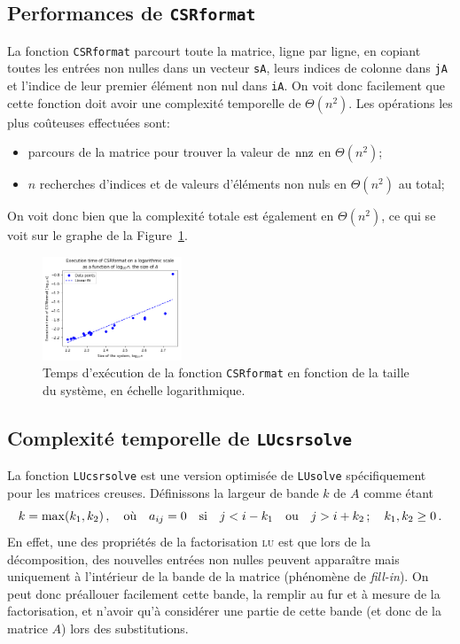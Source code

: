 \documentclass[11pt]{article}
\begin{document}
\subsection{Performances de \texttt{CSRformat}}
\label{sec:csrformat}
La fonction \lstinline|CSRformat| parcourt toute la matrice, ligne par ligne, en copiant toutes les entrées non nulles dans un vecteur \lstinline|sA|, leurs indices de colonne dans \lstinline|jA| et l'indice de leur premier élément non nul dans \lstinline|iA|.
On voit donc facilement que cette fonction doit avoir une complexité temporelle de $\Theta(n^2)$. Les opérations les plus coûteuses effectuées sont:
\begin{itemize}
	\item parcours de la matrice pour trouver la valeur de $\textnormal{nnz}$ en $\Theta(n^2)$;
	\item $n$ recherches d'indices et de valeurs d'éléments non nuls en $\Theta(n^2)$ au total;
\end{itemize}
On voit donc bien que la complexité totale est également en $\Theta(n^2)$, ce qui se voit sur le graphe de la Figure~\ref{fig:csrformat}.
\begin{figure}[H]
	\centering
	\includegraphics[width=0.37\textwidth]{csrformat.png}
	\caption{Temps d'exécution de la fonction \lstinline|CSRformat| en fonction de la taille du système, en échelle logarithmique.}
	\label{fig:csrformat}
\end{figure}
\subsection{Complexité temporelle de \texttt{LUcsrsolve}}
\label{sec:LUcsrsolve}
La fonction \lstinline|LUcsrsolve| est une version optimisée de \lstinline|LUsolve| spécifiquement pour les matrices creuses.
Définissons la largeur de bande $k$ de $A$ comme étant
\[
k = \max(k_1, k_2)\,, \quad \textnormal{où} \quad a_{ij} = 0 \quad \textnormal{si} \quad j < i - k_1 \quad \textnormal{ou} \quad j > i + k_2\,; \quad k_1, k_2 \ge 0\,.
\]
En effet, une des propriétés de la factorisation \textsc{lu} est que lors de la décomposition, des nouvelles entrées non nulles peuvent apparaître mais uniquement à l'intérieur de la bande de la matrice (phénomène de \emph{fill-in}). On peut donc préallouer facilement cette bande, la remplir au fur et à mesure de la factorisation, et n'avoir qu'à considérer une partie de cette bande (et donc de la matrice $A$) lors des substitutions.
\end{document}
